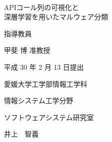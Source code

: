\pagestyle{empty}
\setlength{\oddsidemargin}{-2.0cm}
\setlength{\textwidth}{20cm}

\
\vspace{3cm}

\begin{center}
{\LARGE {APIコール列の可視化と\\深層学習を用いたマルウェア分類}}\\

\vspace{9mm}

{\Large 指導教員}

\vspace{5mm}

{\Large 甲斐 博 准教授}\\

\vspace{6cm}

{\Large 平成 30 年 2 月 13 日提出}\\

\vspace{20mm}

{\Large 愛媛大学工学部情報工学科}\\

\vspace{4mm}

{\Large 情報システム工学分野}\\

\vspace{4mm}

{\Large ソフトウェアシステム研究室}\\

\vspace{18mm}

{\huge 井上　智義}\\

\end{center}


